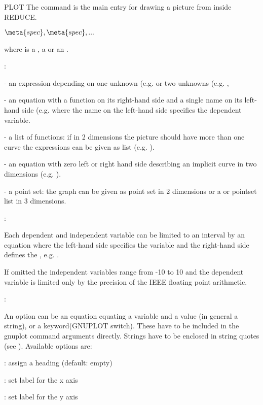 \begin{Command}{PLOT}
The command  is the main entry for drawing a
picture from inside REDUCE.

\begin{Syntax}
\(\meta{spec},\meta{spec},...\)
\end{Syntax}

where  is a , a  or an .

:

- an expression depending
on one unknown (e.g.  or two unknowns (e.g.
,

- an equation with a function on its right-hand
side and a single name on its left-hand side (e.g.
 where the name on the left-hand side specifies
the dependent variable.

- a list of functions:
if in 2 dimensions the picture should have more than one
curve the expressions can be given as list (e.g. ).

- an equation with zero left or right hand side describing
   an implicit curve in two dimensions (e.g. ).

- a point set: the graph can be given
as point set in 2 dimensions or a   or pointset list
in 3 dimensions.

:

Each dependent and independent variable can be limited
to an interval by an equation where the left-hand side specifies
the variable and the right-hand side defines the ,
e.g. .

If omitted the independent variables
range from -10 to 10 and the dependent variable is limited only
by the precision of the IEEE floating point arithmetic.

:

An option can be an equation equating a variable
and a value (in general a string), or a keyword(GNUPLOT switch).
These have to be included in the gnuplot command arguments directly.
Strings have to be enclosed in
string quotes (see ). Available options are:

: assign a heading (default: empty)

: set label for the x axis

: set label for the y axis


\end{Command}
